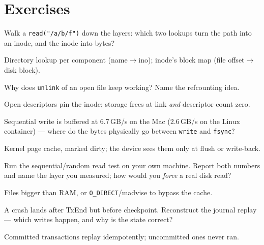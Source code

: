 \section*{Exercises}

\begin{exercise}[easy]
Walk a \texttt{read("/a/b/f")} down the layers: which two lookups
turn the path into an inode, and the inode into bytes?
\end{exercise}
\begin{solution}[hint]
Directory lookup per component (name$\to$ino); inode's block
map (file offset$\to$disk block).
\end{solution}

\begin{exercise}[easy]
Why does \texttt{unlink} of an open file keep working? Name the
refcounting idea.
\end{exercise}
\begin{solution}[hint]
Open descriptors pin the inode; storage frees at link \emph{and}
descriptor count zero.
\end{solution}

\begin{exercise}[easy]
Sequential write is buffered at 6.7\,GB/s on the Mac (2.6\,GB/s on the Linux container) --- where do the
bytes physically go between \texttt{write} and \texttt{fsync}?
\end{exercise}
\begin{solution}[hint]
Kernel page cache, marked dirty; the device sees them only at
flush or write-back.
\end{solution}

\begin{exercise}[medium]
Run the sequential/random read test on your own machine. Report
both numbers and name the layer you measured; how would you
\emph{force} a real disk read?
\end{exercise}
\begin{solution}[hint]
Files bigger than RAM, or \texttt{O\_DIRECT}/madvise to bypass
the cache.
\end{solution}

\begin{exercise}[medium]
A crash lands after TxEnd but before checkpoint. Reconstruct the
journal replay --- which writes happen, and why is the state
correct?
\end{exercise}
\begin{solution}[hint]
Committed transactions replay idempotently; uncommitted ones
never ran.
\end{solution}

